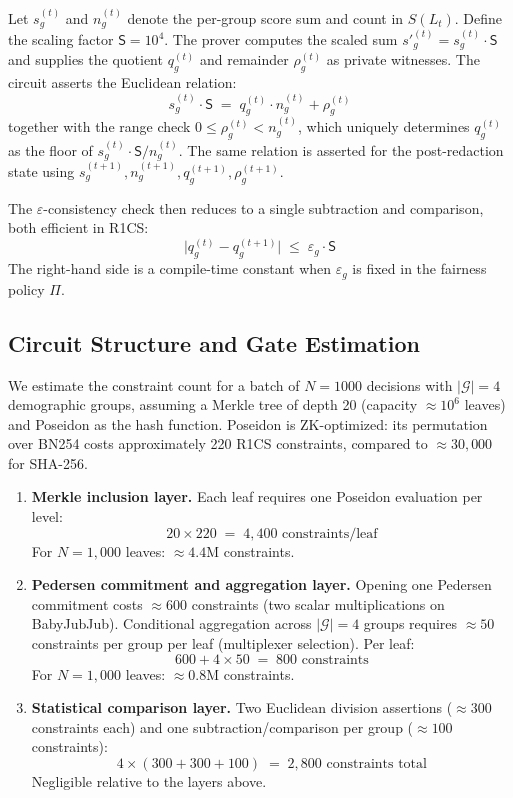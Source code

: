 Let $s_g^{(t)}$ and $n_g^{(t)}$ denote the per-group score sum and count
in $S(L_t)$. Define the scaling factor $\mathsf{S} = 10^4$. The prover
computes the scaled sum $s'^{(t)}_g = s_g^{(t)} \cdot \mathsf{S}$ and
supplies the quotient $q_g^{(t)}$ and remainder $\rho_g^{(t)}$ as private
witnesses. The circuit asserts the Euclidean relation:
\[
  s_g^{(t)} \cdot \mathsf{S} \;=\; q_g^{(t)} \cdot n_g^{(t)} + \rho_g^{(t)}
\]
together with the range check $0 \leq \rho_g^{(t)} < n_g^{(t)}$, which
uniquely determines $q_g^{(t)}$ as the floor of $s_g^{(t)} \cdot
\mathsf{S} / n_g^{(t)}$. The same relation is asserted for the
post-redaction state using $s_g^{(t+1)}, n_g^{(t+1)}, q_g^{(t+1)},
\rho_g^{(t+1)}$.

The $\varepsilon$-consistency check then reduces to a single subtraction
and comparison, both efficient in R1CS:
\[
  \bigl| q_g^{(t)} - q_g^{(t+1)} \bigr| \;\leq\; \varepsilon_g \cdot \mathsf{S}
\]
The right-hand side is a compile-time constant when $\varepsilon_g$ is
fixed in the fairness policy $\Pi$.

\subsection{Circuit Structure and Gate Estimation}
\label{subsec:gates}

We estimate the constraint count for a batch of $N = 1000$ decisions with
$|\mathcal{G}| = 4$ demographic groups, assuming a Merkle tree of depth 20
(capacity $\approx 10^6$ leaves) and Poseidon as the hash function.
Poseidon is ZK-optimized: its permutation over BN254 costs approximately
220 R1CS constraints, compared to $\approx 30{,}000$ for SHA-256.

\begin{enumerate}
  \item \textbf{Merkle inclusion layer.}
  Each leaf requires one Poseidon evaluation per level:
  \[
    20 \times 220 \;=\; 4{,}400 \text{ constraints/leaf}
  \]
  For $N = 1{,}000$ leaves: $\approx 4.4\text{M}$ constraints.

  \item \textbf{Pedersen commitment and aggregation layer.}
  Opening one Pedersen commitment costs $\approx 600$ constraints (two
  scalar multiplications on BabyJubJub). Conditional aggregation across
  $|\mathcal{G}| = 4$ groups requires $\approx 50$ constraints per group
  per leaf (multiplexer selection). Per leaf:
  \[
    600 + 4 \times 50 \;=\; 800 \text{ constraints}
  \]
  For $N = 1{,}000$ leaves: $\approx 0.8\text{M}$ constraints.

  \item \textbf{Statistical comparison layer.}
  Two Euclidean division assertions ($\approx 300$ constraints each) and
  one subtraction/comparison per group ($\approx 100$ constraints):
  \[
    4 \times (300 + 300 + 100) \;=\; 2{,}800 \text{ constraints total}
  \]
  Negligible relative to the layers above.
\end{enumerate}

